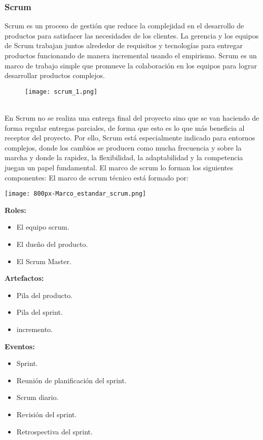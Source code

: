 \documentclass{article}
\begin{document}
\subsubsection{Scrum}
Scrum es un proceso de gestión que reduce la complejidad en el desarrollo de productos para satisfacer las necesidades de los clientes. La gerencia y los equipos de Scrum trabajan juntos alrededor de requisitos 
y tecnologías para entregar productos funcionando de manera incremental usando el empirismo. Scrum es un marco de trabajo simple que promueve la colaboración en los equipos para lograr desarrollar productos complejos. 
\begin{figure}[h]
    \texttt{[image: scrum\_1.png]}
\end{figure}
\\
En Scrum no se realiza una entrega final del proyecto sino que se van haciendo de forma regular entregas parciales, de forma que esto es lo que más beneficia al receptor del proyecto.  Por ello, Scrum está especialmente 
indicado para entornos complejos, donde los cambios se producen como mucha frecuencia y sobre la marcha y donde la rapidez, la flexibilidad, la adaptabilidad y la competencia juegan un papel fundamental. El marco de scrum 
lo forman los siguientes componentes:
El marco de scrum técnico está formado por:

\texttt{[image: 800px-Marco\_estandar\_scrum.png]}

\textbf{Roles:}
\begin{itemize}
    \item El equipo scrum.
    \item El dueño del producto.
    \item El Scrum Master.
\end{itemize}

\textbf{Artefactos:}
\begin{itemize}
    \item Pila del producto.
    \item Pila del sprint.
    \item incremento.
\end{itemize}

\textbf{Eventos:}
\begin{itemize}
    \item Sprint.
    \item Reunión de planificación del sprint.
    \item Scrum diario.
    \item Revisión del sprint.
    \item Retrospectiva del sprint.
\end{itemize}
\end{document}
